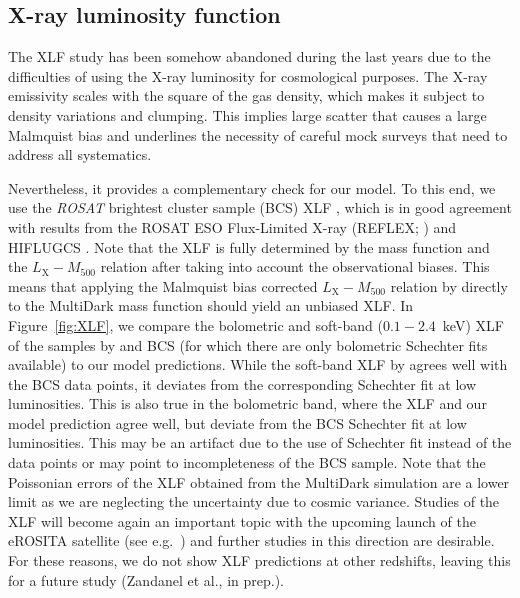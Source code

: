 \documentclass[traditabstract]{aa}
\newcommand{\rmn}{\mathrm}
\begin{document}
\subsection{X-ray luminosity function}

The XLF study has been somehow abandoned during the last years due to the
difficulties of using the X-ray luminosity for cosmological purposes. The X-ray
emissivity scales with the square of the gas density, which makes it subject to
density variations and clumping. This implies large scatter that causes a large
Malmquist bias and underlines the necessity of careful mock surveys that need to
address all systematics.

Nevertheless, it provides a complementary check for our model. To this end, we
use the \emph{ROSAT} brightest cluster sample (BCS) XLF
\citep{1997ApJ...479L.101E}, which is in good agreement with results from the
ROSAT ESO Flux-Limited X-ray (REFLEX; \citealp{2002ApJ...566...93B}) and
HIFLUGCS \citep{2002ApJ...567..716R}.  Note that the XLF is fully determined by
the mass function and the $L_{\rmn{X}}-M_{500}$ relation after taking into
account the observational biases. This means that applying the Malmquist bias
corrected $L_{\rmn{X}}-M_{500}$ relation by \cite{2010MNRAS.406.1773M} directly
to the MultiDark mass function should yield an unbiased XLF. In
Figure~\ref{fig:XLF}, we compare the bolometric and soft-band ($0.1-2.4$~keV)
XLF of the samples by \cite{2010MNRAS.406.1773M} and BCS (for which there are
only bolometric Schechter fits available) to our model predictions.  While the
soft-band XLF by \cite{2010MNRAS.406.1773M} agrees well with the BCS data
points, it deviates from the corresponding Schechter fit at low
luminosities. This is also true in the bolometric band, where the
\cite{2010MNRAS.406.1773M} XLF and our model prediction agree well, but deviate
from the BCS Schechter fit at low luminosities. This may be an artifact due to
the use of Schechter fit instead of the data points or may point to
incompleteness of the BCS sample. Note that the Poissonian errors of the XLF
obtained from the MultiDark simulation are a lower limit as we are neglecting
the uncertainty due to cosmic variance.  Studies of the XLF will become again an
important topic with the upcoming launch of the eROSITA satellite (see
e.g.~\citealp{2011MSAIS..17..159C}) and further studies in this direction are
desirable. For these reasons, we do not show XLF predictions at other redshifts,
leaving this for a future study (Zandanel et al., in prep.).
\end{document}
